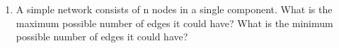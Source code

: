 \documentclass{amsart}
\theoremstyle{definition}
\theoremstyle{remark}
\numberwithin{equation}{section}
\begin{document}
\begin{enumerate}
\vspace{5cm}

\clearpage
\item A simple network consists of n nodes in a single component. What is the maximum possible number of edges it could have? What is the minimum possible number of edges it could have? 

\end{enumerate}
\end{document}
